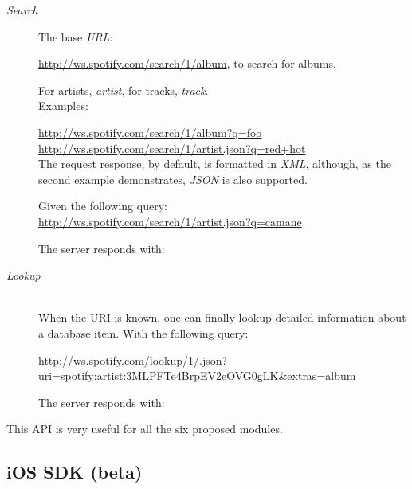       \begin{description}
        \item[\emph{Search}] \hfill

          The base \emph{URL}:

          \url{http://ws.spotify.com/search/1/album}, to search for albums.

          For artists, \emph{artist}, for tracks, \emph{track}. \\

          Examples:

          \url{http://ws.spotify.com/search/1/album?q=foo} \\
          \url{http://ws.spotify.com/search/1/artist.json?q=red+hot} \\

          The request response, by default, is formatted in \emph{XML}, although, as the second example demonstrates, \emph{JSON} is also supported.

          Given the following query: \\
          \url{http://ws.spotify.com/search/1/artist.json?q=camane}

          The server responds with:

          

        \item[\emph{Lookup}] \hfill \\

          When the URI is known, one can finally lookup detailed information about a database item. With the following query:

          \url{http://ws.spotify.com/lookup/1/.json?uri=spotify:artist:3MLPFTe4BrpEV2eOVG0gLK&extras=album}

          The server responds with:

          

      \end{description}

      This API is very useful for all the six proposed modules.


    \subsection{iOS SDK (beta)} %
    \label{sub:ios_sdk}
    
